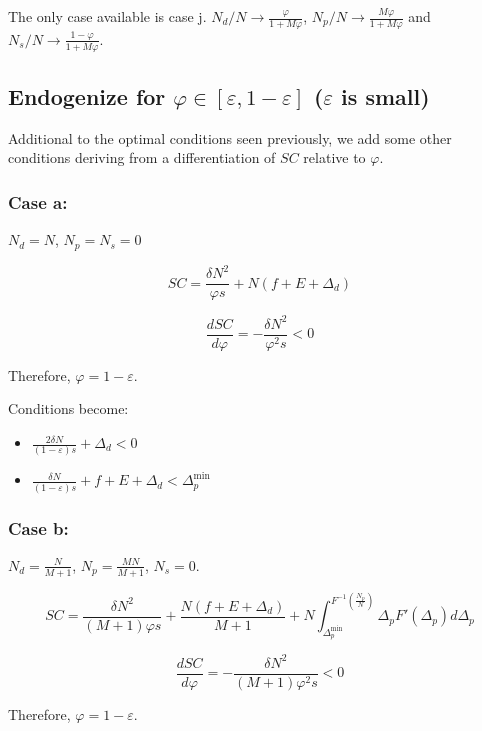 \documentclass[english, a4paper]{article}
\theoremstyle{plain}
\theoremstyle{definition}
\theoremstyle{remark}
\begin{document}
    The only case available is case j. $N_d / N \rightarrow \frac{\varphi}{1 + M\varphi}$, $N_p / N \rightarrow \frac{M\varphi}{1 + M\varphi}$ and $N_s / N \rightarrow \frac{1 - \varphi}{1 + M\varphi}$.

    


    \subsection{Endogenize for $\varphi \in [\varepsilon, 1 - \varepsilon]$ ($\varepsilon$ is small)}

    Additional to the optimal conditions seen previously, we add some other conditions deriving from a differentiation of $SC$ relative to $\varphi$.

    \subsubsection{Case a:}
    $N_d = N$, $N_p = N_s = 0$
    
    \[
    SC = \frac{\delta N^2}{\varphi s} + N(f + E + \Delta_d)
    \]

    \[
    \frac{d SC}{d \varphi} = -\frac{\delta N^2}{\varphi^2 s} < 0
    \]
    
    Therefore, $\varphi = 1 - \varepsilon$.

    Conditions become:
    \begin{itemize}
        \item $\frac{2\delta N}{(1 - \varepsilon) s} + \Delta_d < 0$
        \item $\frac{\delta N}{(1 - \varepsilon) s} + f + E + \Delta_d < \Delta_p^{\text{min}}$
    \end{itemize}

    \subsubsection{Case b:}
    $N_d = \frac{N}{M + 1}$, $N_p = \frac{MN}{M + 1}$, $N_s = 0$.
    
    \[
    SC = \frac{\delta N^2}{(M+1) \varphi s} + \frac{N (f + E + \Delta_d)}{M + 1} + N\int_{\Delta_p^{\text{min}}}^{F^{-1} \left( \frac{N_p}{N}  \right)} \Delta_p F'(\Delta_p)d\Delta_p
    \]

    \[
    \frac{d SC}{d \varphi} = -\frac{\delta N^2}{(M+1)\varphi^2 s} < 0
    \]

    Therefore, $\varphi = 1 - \varepsilon$.
\end{document}

